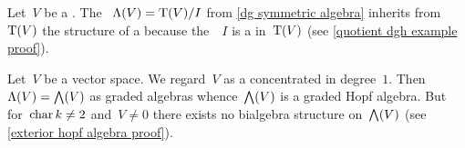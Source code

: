 \documentclass[a4paper,10pt,headings=standardclasses]{scrartcl}
\begin{document}
\begin{example}
  \label{quotient dgh example}
  Let~$V$ be a {\dgv}.
  The {\dga}~$\operatorname{\Lambda}(V) = \operatorname{T}(V)/I$ from \cref{dg symmetric algebra} inherits from~$\operatorname{T}(V)$ the structure of a {\dgh} because the~{\dgi}~$I$ is a {\dghi} in~$\operatorname{T}(V)$ (see \cref{quotient dgh example proof}).
\end{example}

\begin{example}
  \label{exterior hopf algebra}
  Let~$V$ be a vector space.
  We regard~$V$ as a {\dgv} concentrated in degree~$1$.
  Then~$\operatorname{\Lambda}(V) = \bigwedge(V)$ as graded algebras whence~$\bigwedge(V)$ is a graded Hopf algebra.
  But for~$\operatorname{char} k \neq 2$ and~$V \neq 0$ there exists no bialgebra structure on~$\bigwedge(V)$ (see \cref{exterior hopf algebra proof}).
\end{example}

\pagebreak
\end{document}
